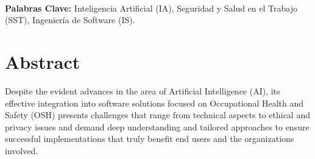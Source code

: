 






\paragraph*{}{\textbf{Palabras Clave:}}
Inteligencia Artificial (IA), Seguridad y Salud en el Trabajo (SST), Ingenier\'ia de Software (IS).

\section*{Abstract}
Despite the evident advances in the area of Artificial Intelligence (AI), its effective integration into software solutions focused on Occupational Health and Safety (OSH) presents challenges that range from technical aspects to ethical and privacy issues and demand deep understanding and tailored approaches to ensure successful implementations that truly benefit end users and the organizations involved.

